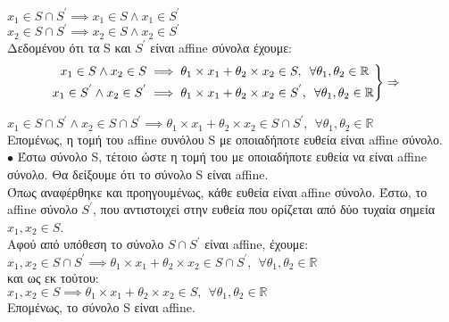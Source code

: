 \documentclass[12pt]{article}
\newcommand{\R}{\mathbb{R}}
\newcommand{\margin}{\hspace{5pt}}
\newenvironment{rcases}
    {\left.\begin{aligned}}
    {\end{aligned}\right\rbrace}
\begin{document}
$x_1 \in S \cap S^{'} \implies x_1 \in S \wedge x_1 \in S^{'}$\\
$x_2 \in S \cap S^{'} \implies x_2 \in S \wedge x_2 \in S^{'}$\\

Δεδομένου ότι τα S και $S^{'}$ είναι affine σύνολα έχουμε:\\

\begin{align*}
    &\begin{rcases}
        x_1 \in S \wedge x_2 \in S & \implies \theta_1 \times x_1 + \theta_2 \times x_2 \in S, \margin \forall \theta_1, \theta_2 \in \R\\
        x_1 \in S^{'} \wedge x_2 \in S^{'} & \implies \theta_1 \times x_1 + \theta_2 \times x_2 \in S^{'}, \margin \forall \theta_1, \theta_2 \in \R
    \end{rcases}
    \Rightarrow
\end{align*}

$x_1 \in S \cap S^{'} \wedge x_2 \in S \cap S^{'} \implies \theta_1 \times x_1 + \theta_2 \times x_2 \in S \cap S^{'}, \margin \forall \theta_1, \theta_2 \in \R$\\

Επομένως, η τομή του affine συνόλου S με οποιαδήποτε ευθεία είναι affine σύνολο.\\

$\bullet$ Έστω σύνολο S, τέτοιο ώστε η τομή του με οποιαδήποτε ευθεία να είναι affine σύνολο.
Θα δείξουμε ότι το σύνολο S είναι affine.\\

Όπως αναφέρθηκε και προηγουμένως, κάθε ευθεία είναι affine σύνολο.
Έστω, το affine σύνολο $S^{'}$, που αντιστοιχεί στην ευθεία 
που ορίζεται από δύο τυχαία σημεία $x_1, x_2 \in S$.\\

Αφού από υπόθεση το σύνολο $S \cap S^{'}$ είναι affine, έχουμε:\\

$x_1, x_2 \in S \cap S^{'} \implies  \theta_1 \times x_1 + \theta_2 \times x_2 \in S \cap S^{'}, \margin \forall \theta_1, \theta_2 \in \R$\\

και ως εκ τούτου:\\

$x_1, x_2 \in S \implies  \theta_1 \times x_1 + \theta_2 \times x_2 \in S, \margin \forall \theta_1, \theta_2 \in \R$\\

Επομένως, το σύνολο S είναι affine.
\end{document}

